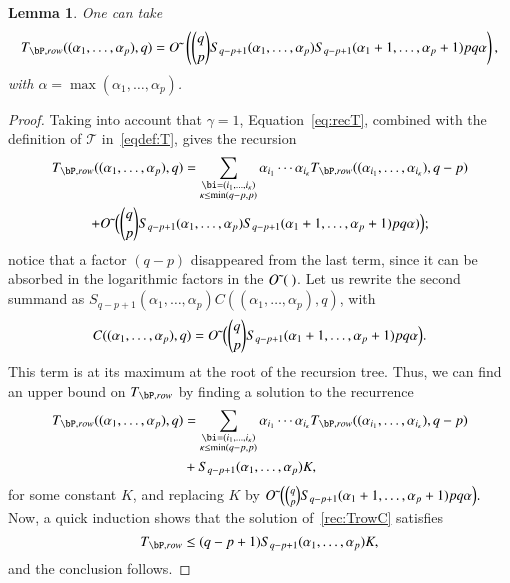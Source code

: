 \documentclass[amsthm]{elsart}
\newtheorem{lemma}[definition]{Lemma}
\begin{document}
\begin{lemma}\label{lemma:TMrow}
  One can take
  $$T_{\bP,{\rm row}}((\alpha_1,\dots,\alpha_p),q)= \softO\left ({q
    \choose p} S_{q-p+1}(\alpha_1,\dots,\alpha_p) S_{q-p+1}(\alpha_1+1,\dots,\alpha_p+1) pq \alpha \right), $$ with
 $\alpha =\max(\alpha_1,\dots,\alpha_p)$.
\end{lemma}
\begin{proof}
  Taking into account that $\gamma=1$, Equation~\eqref{eq:recT},
  combined with the definition of $\mathscr{T}$ in~\eqref{eqdef:T}, gives the
  recursion
  \begin{multline}
  T_{\bP,{\rm row}}((\alpha_1,\dots,\alpha_p),q)=
\sum_{\substack{\bi=(i_1,\dots,i_\kappa)\\ \kappa\le\min(q-p,p)}}
\alpha_{i_1} \cdots \alpha_{i_\kappa} T_{\bP,{\rm row}}((\alpha_{i_1},\dots,\alpha_{i_\kappa}), q-p)
\\ + \softO\Big(
 {q \choose p} S_{q-p+1}(\alpha_1,\dots,\alpha_p) S_{q-p+1}(\alpha_1+1,\dots,\alpha_p+1) p q  \alpha )
\Big);
  \end{multline}
notice that 
a factor $(q-p)$ disappeared from the last term, since
it can be absorbed in the logarithmic factors in the $\softO(\ )$.
Let us rewrite the second summand as 
$S_{q-p+1}(\alpha_1,\dots,\alpha_p) C((\alpha_1,\dots,\alpha_p),q)$,
with
\[
C((\alpha_1,\dots,\alpha_p),q)= {O}{\,\tilde{ }\,}\Big(
 {q \choose p} S_{q-p+1}(\alpha_1+1,\dots,\alpha_p+1) p q  \alpha 
\Big).
\]
This term is at its maximum at
  the root of the recursion tree.  Thus, we can find an upper bound on
  $T_{\bP,{\rm row}}$ by finding a solution to the recurrence
  \begin{align}\label{rec:TrowC}
  T_{\bP,{\rm row}}((\alpha_1,\dots,\alpha_p),q)&=
\sum_{\substack{\bi=(i_1,\dots,i_\kappa)\\ \kappa\le\min(q-p,p)}}
\alpha_{i_1} \cdots \alpha_{i_\kappa} T_{\bP,{\rm row}}((\alpha_{i_1},\dots,\alpha_{i_\kappa}), q-p)\\
&+ S_{q-p+1}(\alpha_1,\dots,\alpha_p) K,
  \end{align}
  for some constant $K$, and replacing $K$ by $
 {O}{\,\tilde{ }\,}\Big(
 {q \choose p} S_{q-p+1}(\alpha_1+1,\dots,\alpha_p+1) p q  \alpha 
\Big). $  Now, a quick induction shows
that the   solution of~\eqref{rec:TrowC} satisfies 
$$T_{\bP,{\rm row}} \le   (q-p+1) S_{q-p+1} 
(\alpha_1,\dots,\alpha_p)K,$$  and the conclusion follows.
\end{proof}
\end{document}
